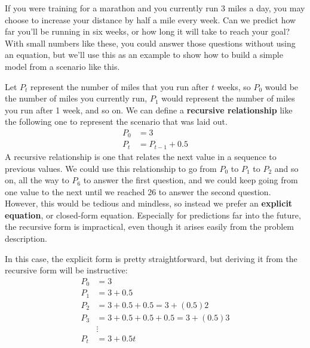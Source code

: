 \setcounter{ExampleCounter}{1}
If you were training for a marathon and you currently run 3 miles a day, you may choose to increase your distance by half a mile every week.  Can we predict how far you'll be running in six weeks, or how long it will take to reach your goal?  With small numbers like these, you could answer those questions without using an equation, but we'll use this as an example to show how to build a simple model from a scenario like this.

Let $P_t$ represent the number of miles that you run after $t$ weeks, so $P_0$ would be the number of miles you currently run, $P_1$ would represent the number of miles you run after 1 week, and so on.  We can define a \textbf{recursive relationship} like the following one to represent the scenario that was laid out.
\begin{align*}
P_0 &= 3\\
P_t &= P_{t-1} + 0.5
\end{align*}
A recursive relationship is one that relates the next value in a sequence to previous values.  We could use this relationship to go from $P_0$ to $P_1$ to $P_2$ and so on, all the way to $P_6$ to answer the first question, and we could keep going from one value to the next until we reached 26 to answer the second question.  However, this would be tedious and mindless, so instead we prefer an \textbf{explicit equation}, or closed-form equation.  Especially for predictions far into the future, the recursive form is impractical, even though it arises easily from the problem description.

In this case, the explicit form is pretty straightforward, but deriving it from the recursive form will be instructive:
\begin{align*}
P_0 &= 3\\
P_1 &= 3+0.5\\
P_2 &= 3+0.5+0.5 = 3+(0.5)2\\
P_3 &= 3+0.5+0.5+0.5 = 3 + (0.5)3\\
&\vdots\\
P_t &= 3 + 0.5t
\end{align*}

